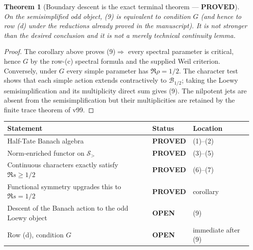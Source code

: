 \documentclass[11pt]{article}
\newcommand{\PROVED}{\textcolor{green!40!black}{\textbf{PROVED}}}
\newcommand{\OPEN}{\textcolor{red!70!black}{\textbf{OPEN}}}
\newtheorem{theorem}{Theorem}
\begin{document}
\begin{theorem}[Boundary descent is the exact terminal theorem ---
\PROVED]
On the semisimplified odd object, (9) is equivalent to condition $G$ (and
hence to row (d) under the reductions already proved in the manuscript).
It is not stronger than the desired conclusion and it is not a merely
technical continuity lemma.
\end{theorem}

\begin{proof}
The corollary above proves (9)$\Rightarrow$ every spectral parameter is
critical, hence $G$ by the row-(c) spectral formula and the supplied Weil
criterion.  Conversely, under $G$ every simple parameter has
$\Re\rho=1/2$.  The character test shows that each simple action extends
contractively to $\mathcal B_{1/2}$; taking the Loewy semisimplification
and its multiplicity direct sum gives (9).  The nilpotent jets are absent
from the semisimplification but their multiplicities are retained by the
finite trace theorem of v99.
\end{proof}

\begin{center}
\begin{tabular}{>{\raggedright\arraybackslash}p{.57\linewidth}
                >{\centering\arraybackslash}p{.15\linewidth}
                >{\raggedright\arraybackslash}p{.18\linewidth}}
\toprule
Statement & Status & Location \\
\midrule
Half-Tate Banach algebra & \PROVED & (1)--(2) \\
Norm-enriched functor on $\mathcal S_>$ & \PROVED & (3)--(5) \\
Continuous characters exactly satisfy $\Re s\ge1/2$ & \PROVED & (6)--(7) \\
Functional symmetry upgrades this to $\Re s=1/2$ & \PROVED & corollary \\
Descent of the Banach action to the odd Loewy object & \OPEN & (9) \\
Row (d), condition $G$ & \OPEN & immediate after (9) \\
\bottomrule
\end{tabular}
\end{center}
\end{document}
